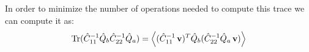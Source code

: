 \documentclass[a4paper,10pt]{article}
\newcommand{\Tr}{{\rm Tr}}
\newcommand{\nv}{\hat{\bf n}}
\begin{document}
\begin{itemize}
 In order to minimize the number of operations needed to compute this trace we can compute
 it as:
 \begin{equation}
   \Tr(\hat{C}^{-1}_{11}\hat{Q}_b\hat{C}^{-1}_{22}\hat{Q}_a)=
   \left\langle(\hat{C}^{-1}_{11}\,{\bf v})^T\hat{Q}_b(\hat{C}^{-1}_{22}\hat{Q}_a\,{\bf v})\right\rangle
 \end{equation}

\end{itemize}

%
\end{document}
